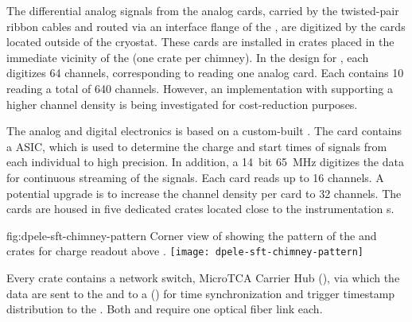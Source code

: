 The differential analog signals from the analog  cards, carried by the twisted-pair ribbon cables and routed via an interface flange of the , are digitized by the  cards located %
outside of the cryostat. These cards are %
installed in  crates placed in the immediate vicinity of the  (one crate per chimney). %
In the design for , each  digitizes \num{64} channels, corresponding to reading one  analog card. Each   contains \num{10}  reading a total of \num{640} channels. However, an implementation with  supporting a higher channel density is being investigated for cost-reduction purposes. 

The   analog and digital electronics is based on a custom-built . The card contains a  ASIC, which is used to determine %
the charge and start times of signals from each individual  to high precision. In addition, a \SI{14}{bit} \SI{65}{MHz}  digitizes the data for continuous streaming of the  signals. Each card reads up to \num{16} channels. A potential %
upgrade is to increase the channel density per card to \num{32} channels. The  cards are housed in five dedicated  crates located close to the  instrumentation \fdth{}s.

\begin{dunefigure}{fig:dpele-sft-chimney-pattern}
{Corner view of  showing the pattern of the  and  crates for charge readout above .}
\texttt{[image: dpele-sft-chimney-pattern]}
\end{dunefigure}

Every  crate contains a network switch, MicroTCA Carrier Hub (), via which the data are sent to the   and to %
a () for %
time synchronization and trigger timestamp distribution to the . Both  and  require one optical fiber link each. 

